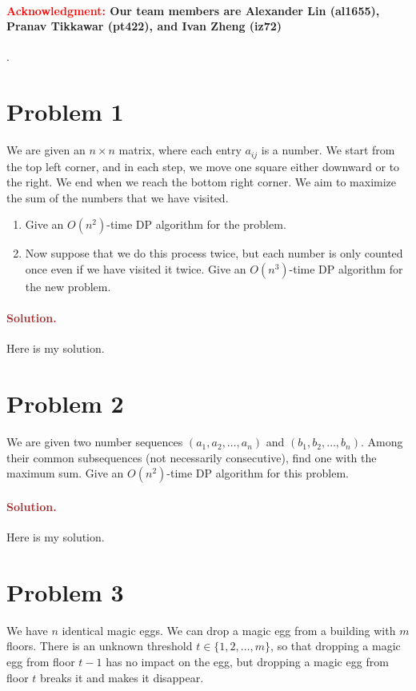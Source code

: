 \paragraph{\textcolor{red}{Acknowledgment:} Our team members are \textbf{Alexander Lin (al1655)}, \textbf{Pranav Tikkawar (pt422)}, and \textbf{Ivan Zheng (iz72)}}.

\section*{Problem 1}
We are given an $n \times n$ matrix, where each entry $a_{ij}$ is a number.
We start from the top left corner, and in each step, we move one square either downward or to the right. We end when we reach the bottom right corner. We aim to maximize the sum of the numbers that we have visited.
\begin{enumerate}
    \item Give an $O(n^2)$-time DP algorithm for the problem.
    \item Now suppose that we do this process twice, but each number is only counted once even if we have visited it twice. Give an $O(n^3)$-time DP algorithm for the new problem.
\end{enumerate}

\paragraph{\textcolor{brown}{Solution.}}
Here is my solution.


\section*{Problem 2}
We are given two number sequences $(a_1, a_2, \ldots, a_n)$ and $(b_1, b_2, \ldots, b_n)$. Among their common subsequences (not necessarily consecutive), find one with the maximum sum. Give an $O(n^2)$-time DP algorithm for this problem.

\paragraph{\textcolor{brown}{Solution.}}
Here is my solution.


\section*{Problem 3}
We have $n$ identical magic eggs. We can drop a magic egg from a building with $m$ floors. There is an unknown threshold $t \in \{1, 2, \ldots, m\}$, so that dropping a magic egg from floor $t - 1$ has no impact on the egg, but dropping a magic egg from floor $t$ breaks it and makes it disappear.

